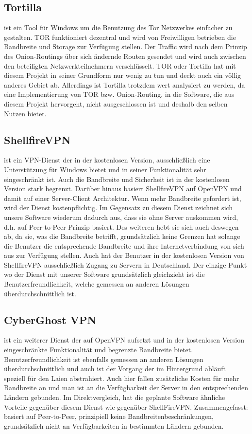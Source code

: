 \documentclass[a4paper,12pt]{scrreprt}
\begin{document}
	\subsection{Tortilla} ist ein Tool für Windows um die Benutzung des Tor Netzwerkes einfacher zu gestalten. TOR funktioniert dezentral und wird von Freiwilligen betrieben die Bandbreite und Storage zur Verfügung stellen. Der Traffic wird nach dem Prinzip des Onion-Routings über sich ändernde Routen gesendet und wird auch zwischen den beteiligten Netzwerkteilnehmern verschlüsselt. TOR oder Tortilla hat mit diesem Projekt in seiner Grundform nur wenig zu tun und deckt auch ein völlig anderes Gebiet ab. Allerdings ist Tortilla trotzdem wert analysiert zu werden, da eine Implementierung von TOR bzw. Onion-Routing, in die Software, die aus diesem Projekt hervorgeht, nicht ausgeschlossen ist und deshalb den selben Nutzen bietet.
	
	\subsection{ShellfireVPN} ist ein VPN-Dienst der in der kostenlosen Version, ausschließlich eine Unterstützung für Windows bietet und in seiner Funktionalität sehr eingeschränkt ist. Auch die Bandbreite und Sicherheit ist in der kostenlosen Version stark begrenzt. Darüber hinaus basiert ShellfireVPN auf OpenVPN und damit auf einer Server-Client Architektur. Wenn mehr Bandbreite gefordert ist, wird der Dienst kostenpflichtig. Im Gegensatz zu diesem Dienst zeichnet sich unsere Software wiederum dadurch aus, dass sie ohne Server auskommen wird, d.h. auf Peer-to-Peer Prinzip basiert. Des weiteren hebt sie sich auch deswegen ab, da sie, was die Bandbreite betrifft, grundsätzlich keine Grenzen hat solange die Benutzer die entsprechende Bandbreite und ihre Internetverbindung von sich aus zur Verfügung stellen. Auch hat der Benutzer in der kostenlosen Version von ShellfireVPN ausschließlich Zugang zu Servern in Deutschland. Der einzige Punkt wo der Dienst mit unserer Software grundsätzlich gleichzieht ist die Benutzerfreundlichkeit, welche gemessen an anderen Lösungen überdurchschnittlich ist.
	
	\subsection{CyberGhost VPN} ist ein weiterer Dienst der auf OpenVPN aufsetzt und in der kostenlosen Version eingeschränkte Funktionalität und begrenzte Bandbreite bietet. Benutzerfreundlichkeit ist ebenfalls gemessen an anderen Lösungen überdurchschnittlich und auch ist der Vorgang der im Hintergrund abläuft speziell für den Laien abstrahiert. Auch hier fallen zusätzliche Kosten für mehr Bandbreite an und man ist an die Verfügbarkeit der Server in den entsprechenden Ländern gebunden. Im Direktvergleich, hat die geplante Software ähnliche Vorteile gegenüber diesem Dienst wie gegenüber ShellFireVPN. Zusammengefasst: basiert auf Peer-to-Peer, prinzipiell keine Bandbreitenbeschränkungen, grundsätzlich nicht an Verfügbarkeiten in bestimmten Ländern gebunden.
	
\end{document}
